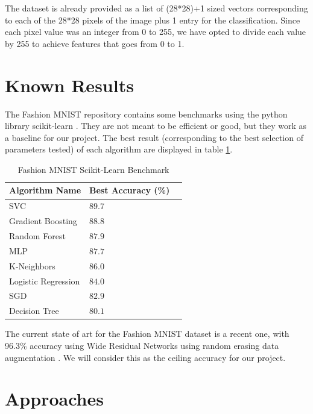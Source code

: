 \documentclass[twoside,twocolumn]{article}
\begin{document}
The dataset is already provided as a list of (28*28)+1 sized vectors corresponding
to each of the 28*28 pixels of the image plus 1 entry for the classification.
Since each pixel value was an integer from 0 to 255, we have opted to divide
each value by 255 to achieve features that goes from 0 to 1.


\section{Known Results}

The Fashion MNIST repository contains some benchmarks using the python library
scikit-learn \cite{scikitlearn} \cite{scikitlearnbenchmark}. They are not meant
to be efficient or good, but they work as a baseline for our project.
The best result (corresponding to the best selection of parameters tested)
of each algorithm are displayed in table \ref{table:scikit-benchmark}.

\begin{table}
\centering
\begin{tabular}{llr}
\toprule
Algorithm Name & Best Accuracy (\%) \\
\midrule
SVC & $89.7$ \\
Gradient Boosting & $88.8$ \\
Random Forest & $87.9$ \\
MLP & $87.7$ \\
K-Neighbors & $86.0$ \\
Logistic Regression & $84.0$ \\
SGD & $82.9$ \\
Decision Tree & $80.1$ \\
\bottomrule
\end{tabular}
\caption{Fashion MNIST Scikit-Learn Benchmark \cite{scikitlearnbenchmark} }
\label{table:scikit-benchmark}
\end{table}

The current state of art for the Fashion MNIST dataset is a recent one, with 96.3\% accuracy using Wide
Residual Networks using random erasing data augmentation \cite{randomerasingdataaugmentationpaper}.
We will consider this as the ceiling accuracy for our project.


\section{Approaches}
\end{document}
